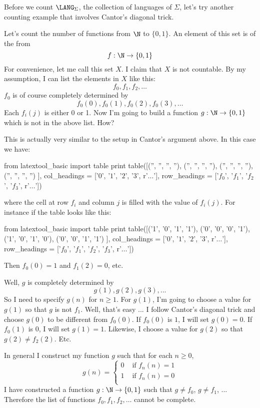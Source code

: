 Before we count $\LANG_\Sigma$,
the collection of languages of $\Sigma$,
let's try another counting example that involves Cantor's diagonal trick.

Let's count the number of functions from $\N$ to $\{0, 1\}$.
An element of this set is of the from
\[
f: \N \rightarrow \{0, 1\}
\]
For convenience, let me call this set $X$.
I claim that $X$ is not countable.
By my assumption, I can list the elements in $X$ like this:
\[
f_0, f_1, f_2, \ldots
\]
$f_0$ is of course completely determined by 
\[
f_0(0), f_0(1), f_0(2), f_0(3), \ldots
\]
Each $f_i(j)$ is either 0 or 1.
Now I'm going to build a function $g : \N \rightarrow \{0, 1\}$
which is not in the above list.
How?

This is actually very similar to the setup in Cantor's argument
above.
In this case we have:

\begin{python}
from latextool_basic import table
print table([('', '', '', ''),
('', '', '', ''),
('', '', '', ''),
('', '', '', '')
],
col_headings = ['$0$', '$1$', '$2$', '$3$', r'$\ldots$'],
row_headings = ['$f_0$', '$f_1$', '$f_2$', '$f_3$', r'$\ldots$'])
\end{python}

where the cell at row $f_i$ and column $j$ is filled with the
value of $f_i(j)$.
For instance if the table looks like this:
\begin{python}
from latextool_basic import table
print table([('1', '0', '1', '1'),
('0', '0', '0', '1'),
('1', '0', '1', '0'),
('0', '0', '1', '1')
],
col_headings = ['$0$', '$1$', '$2$', '$3$', r'$\ldots$'],
row_headings = ['$f_0$', '$f_1$', '$f_2$', '$f_3$', r'$\ldots$'])
\end{python}

Then $f_0(0) = 1$ and $f_1(2) = 0$, etc.

Well, $g$ is completely determined by 
\[
g(1), g(2), g(3), ...
\]
So I need to specify $g(n)$ for $n \geq 1$.
For $g(1)$, I'm going to choose a value for $g(1)$ so that 
$g$ is not $f_1$.
Well, that's easy ... I follow Cantor's diagonal trick
and choose $g(0)$ to be different from $f_0(0)$.
If $f_0(0)$ is $1$, I will set $g(0) = 0$.
If $f_0(1)$ is $0$, I will set $g(1) = 1$.
Likewise, I choose a value for $g(2)$ so that $g(2) \neq f_2(2)$.
Etc.

In general I construct my function $g$ such that
for each $n \geq 0$,
\[
g(n)
= 
\begin{cases}
0 & \text{ if } f_n(n) = 1 \\
1 & \text{ if } f_n(n) = 0 \\
\end{cases}
\]
I have constructed a function $g : \N \rightarrow \{0, 1\}$
such that $g \neq f_0$, $g \neq f_1$, ...
Therefore the list of functions $f_0, f_1, f_2, \ldots$ cannot be 
complete.

